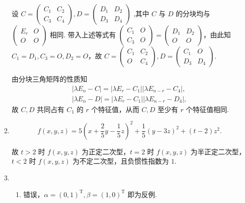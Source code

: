 \begin{enumerate}
    设 \(C=\begin{pmatrix}
        C_1 & C_2\\
        C_3 & C_4
        \end{pmatrix},
        D=\begin{pmatrix}
        D_1 & D_2\\
        D_3 & D_4
        \end{pmatrix}\) ,其中 \(C\) 与 \(D\) 的分块均与 \(\begin{pmatrix}E_r & O\\O & O\end{pmatrix}\) 相同. 带入上述等式有 \(\begin{pmatrix}
            C_1 & O\\
            C_3 & O
            \end{pmatrix}=
            \begin{pmatrix}
            D_1 & D_2\\
            O & O
            \end{pmatrix}\)，由此知 \(C_1=D_1,C_3=O,D_2=O\)，故
        \(C=\begin{pmatrix}
        C_1 & C_2\\
        O & C_4
        \end{pmatrix},
        D=\begin{pmatrix}
        C_1 & O\\
        D_3 & D_4
        \end{pmatrix}\).

        由分块三角矩阵的性质知
        \begin{gather*}
            |\lambda E_n-C|=|\lambda E_r-C_1||\lambda E_{n-r}-C_4|,\\
            |\lambda E_n-D|=|\lambda E_r-C_1||\lambda E_{n-r}-D_4|,
        \end{gather*}
        故 \(C,D\) 共同占有 \(C_1\) 的 \(r\) 个特征值，从而 \(C,D\) 至少有 \(r\) 个特征值相同.

    \item
    \[f(x,y,z)=5\left(x+\frac{2}{5}y-\frac15 z\right)^2+\frac15(y-3z)^2+(t-2)z^2. \]

    故 \(t>2\) 时 \(f(x,y,z)\) 为正定二次型，\(t=2\) 时 \(f(x,y,z)\) 为半正定二次型，\(t<2\) 时 \(f(x,y,z)\) 为不定二次型，且负惯性指数为 \(1\).

    \item
    \begin{enumerate}
        \item 错误，\(\alpha=(0, 1)^\mathrm{T},\beta=(1, 0)^\mathrm{T}\) 即为反例.


\end{enumerate}
\end{enumerate}
